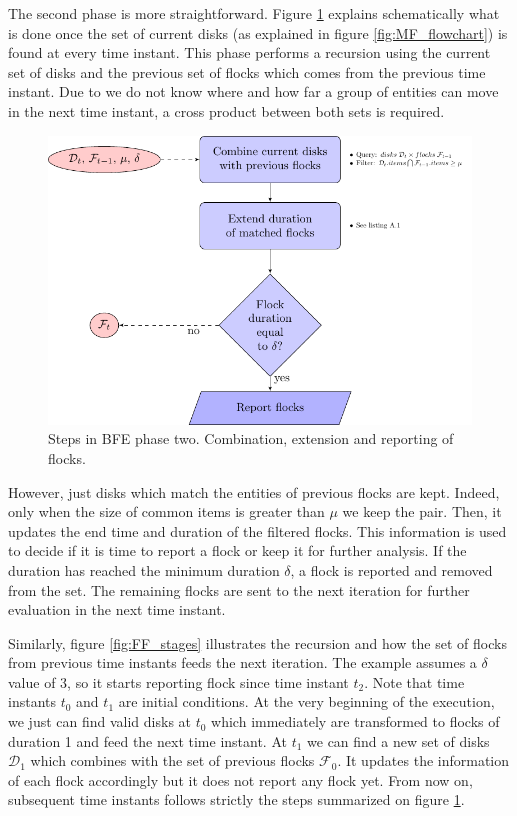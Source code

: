 The second phase is more straightforward.  Figure \ref{fig:FF_flowchart} explains schematically what is done once the set of current disks (as explained in figure \ref{fig:MF_flowchart}) is found at every time instant.  This phase performs a recursion using the current set of disks and the previous set of flocks which comes from the  previous time instant.  Due to we do not know where and how far a group of entities can move in the next time instant, a cross product between both sets is required.  

\begin{figure}
    \centering
    \includegraphics[width=\linewidth]{figures/FF_flowchart}
    \caption{Steps in BFE phase two. Combination, extension and reporting of flocks.}\label{fig:FF_flowchart}
\end{figure}

However, just disks which match the entities of previous flocks are kept.  Indeed, only when the size of common items is greater than $\mu$ we keep the pair.  Then, it updates the end time and duration of the filtered flocks.  This information is used to decide if it is time to report a flock or keep it for further analysis.  If the duration has reached the minimum duration $\delta$, a flock is reported and removed from the set.  The remaining flocks are sent to the next iteration for further evaluation in the next time instant.

Similarly, figure \ref{fig:FF_stages} illustrates the recursion and how the set of flocks from previous time instants feeds the next iteration.  The example assumes a $\delta$ value of 3, so it starts reporting flock since time instant $t_2$.  Note that time instants $t_0$ and $t_1$ are initial conditions.  At the very beginning of the execution, we just can find valid disks at $t_0$ which immediately are transformed to flocks of duration 1 and feed the next time instant.  At $t_1$ we can find a new set of disks $\mathcal{D}_1$ which combines with the set of previous flocks $\mathcal{F}_0$.  It updates the information of each flock accordingly but it does not report any flock yet.  From now on, subsequent time instants follows strictly the steps summarized on figure \ref{fig:FF_flowchart}.

